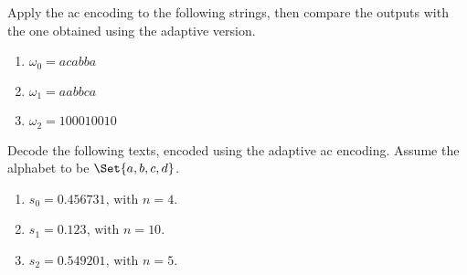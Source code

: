 \documentclass{subfiles}
\begin{document}
    \begin{exercise}
        Apply the \gls{ac} encoding to the following strings, 
            then compare the outputs with the one obtained using the adaptive version.
            \begin{enumerate}
                \item \(\omega_{0} = acabba\)
                \item \(\omega_{1} = aabbca\)
                \item \(\omega_{2} = 100010010\)
            \end{enumerate}
    \end{exercise}

    \begin{exercise}
        Decode the following texts, encoded using the adaptive \gls{ac} encoding.
        Assume the alphabet to be \(\Set{a, b, c, d}\).
        \begin{enumerate}
            \item \(s_{0} = 0.456731 \text{, with } n = 4\).
            \item \(s_{1} = 0.123 \text{, with } n = 10\).
            \item \(s_{2} = 0.549201 \text{, with } n = 5\).
        \end{enumerate}
    \end{exercise}
\end{document}

